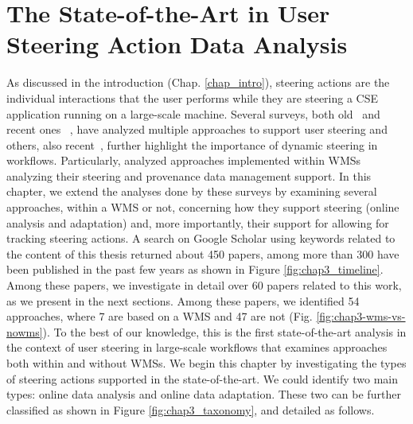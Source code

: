 \chapter{The State-of-the-Art in User Steering Action Data Analysis}
\label{chap3}

As discussed in the introduction (Chap. \ref{chap_intro}), steering actions are the individual interactions that the user performs while they are steering a CSE application running on a large-scale machine.
Several surveys, both old~\cite{MulderSurvey,Xian2008Computational} and recent ones~ \cite{Ayachit2016Performance, Bauer2016In}, have analyzed multiple approaches to support user steering and others, also recent~\cite{deelman_future_2017,Mattoso2015Dynamic,F.daSilva2017characterization,Atkinson2017Scientific,Netto2018HPC}, further highlight the importance of dynamic steering in workflows.
Particularly, \citet{Mattoso2015Dynamic}
  analyzed approaches implemented within WMSs analyzing their steering and provenance data management support.
In this chapter, we extend the analyses done by these surveys by examining several approaches, within a WMS or not, concerning how they support steering (online analysis and adaptation) and, more importantly, their support for allowing for tracking steering actions.
A search on Google Scholar using keywords related to the content of this thesis returned about 450 papers, among more than 300 have been published in the past few years as shown in Figure \ref{fig:chap3_timeline}.
Among these papers, we investigate in detail over 60 papers related to this work, as we present in the next sections. Among these papers, we identified 54 approaches, where 7 are based on a WMS and 47 are not (Fig. \ref{fig:chap3-wms-vs-nowms}). To the best of our knowledge, this is the first state-of-the-art analysis in the context of user steering in large-scale workflows that examines approaches both within and without WMSs.
We begin this chapter by investigating the types of steering actions supported in the state-of-the-art. We could identify two main types: online data analysis and online data adaptation. These two can be further classified as shown in Figure \ref{fig:chap3_taxonomy}, and detailed as follows.


